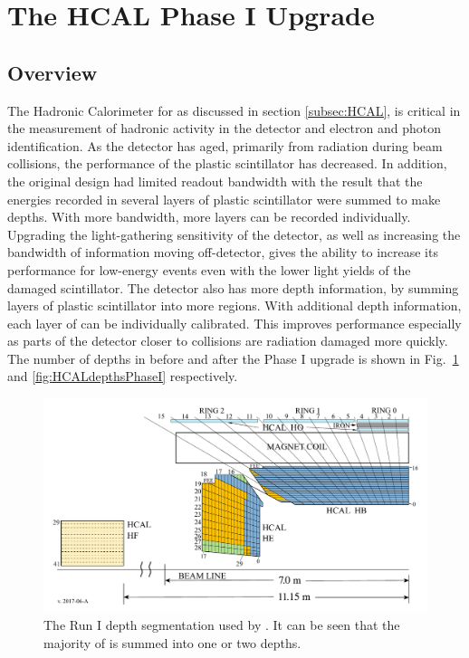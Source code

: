 \section{The HCAL Phase I Upgrade}
\label{sec:hcalphaseI}
\subsection{Overview}
The Hadronic Calorimeter for \CMS as discussed in section \ref{subsec:HCAL}, is critical in the measurement of hadronic activity in the detector and electron and photon identification. As the detector has aged, primarily from radiation during beam collisions, the performance of the plastic scintillator has decreased. In addition, the original \HCAL design had limited readout bandwidth with the result that the energies recorded in several layers of plastic scintillator were summed to make depths.  With more bandwidth, more layers can be recorded individually. Upgrading the light-gathering sensitivity of the detector, as well as increasing the bandwidth of information moving off-detector, gives \HCAL the ability to increase its performance for low-energy events even with the lower light yields of the damaged scintillator.  The detector also has more depth information, by summing layers of plastic scintillator into more regions. With additional depth information, each layer of \HCAL can be individually calibrated. This improves performance especially as parts of the detector closer to collisions are radiation damaged more quickly. The number of depths in \HCAL before and after the Phase I upgrade is shown in Fig.~\ref{fig:HCALdepthsRunI} and \ref{fig:HCALdepthsPhaseI} respectively.

\begin{figure}[!tp]
    \centering
    \includegraphics[width=\textwidth]{figures/HCAL-Depth-Segmentation-Legacy-View-HBHEHFHO-v201706A.pdf}
    \caption[
       \HCAL legacy depth segmentation.
    ]{
        The Run I depth segmentation used by \HCAL.  It can be seen that the majority of \HCAL is summed into one or two depths.
    }
    \label{fig:HCALdepthsRunI}
\end{figure}


